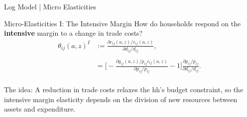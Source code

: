 \documentclass[9pt,pdftex,aspectratio=1610]{beamer}
\theoremstyle{definition}
\begin{document}
\begin{frame}[t]{Log Model | Micro Elasticities}
\begin{figure}[!t]
\end{figure}
\end{frame}



\begin{frame}[t]{Micro-Elasticities I: The Intensive Margin}
\smallskip
How do households respond on the \textbf{intensive} margin to a change in trade costs?
\begin{align*}
\theta_{ij}(a,z)^{I} & := \frac{\partial c_{ij}(a,z)/ c_{ij}(a,z)}{\partial d_{ij} / d_{ij}}, \\
\\
& = \bigg [-\frac{\partial g_{ij}(a,z)/ p_{ij}c_{ij}(a,z)}{\partial p_{ij}/ p_{ij}} - 1 \bigg ]\frac{\partial p_{ij}/p_{ij}}{\partial d_{ij}/ d_{ij}}.
\end{align*}\\
\bigskip
\medskip
The idea: A reduction in trade costs relaxes the hh's budget constraint, so the intensive margin elasticity depends on the division of new resources between assets and expenditure.
\end{frame}

\end{document}
